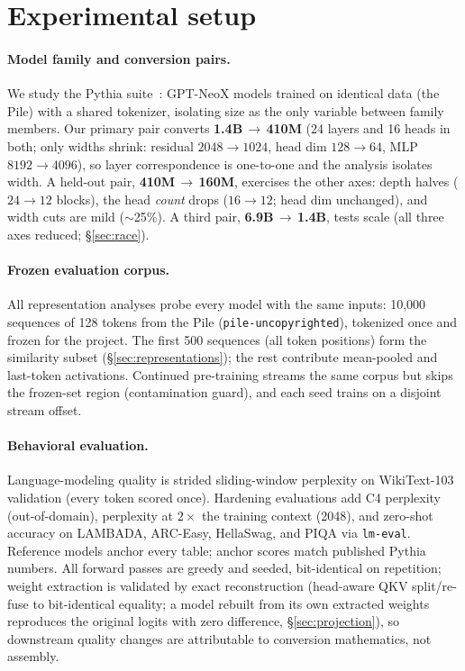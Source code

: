 \section{Experimental setup}
\label{sec:setup}

\paragraph{Model family and conversion pairs.}
We study the Pythia suite~\citep{biderman2023pythia}: GPT-NeoX models trained on
identical data (the Pile) with a shared tokenizer, isolating size as the
only variable between family members. Our primary pair converts
\textbf{1.4B}$\,\to\,$\textbf{410M} (24 layers and 16 heads in both; only widths
shrink: residual $2048\!\to\!1024$, head dim $128\!\to\!64$, MLP
$8192\!\to\!4096$), so layer correspondence is one-to-one and the analysis
isolates width. A held-out pair, \textbf{410M}$\,\to\,$\textbf{160M}, exercises
the other axes: depth halves ($24\!\to\!12$ blocks), the head \emph{count} drops
($16\!\to\!12$; head dim unchanged), and width cuts are mild ($\sim$25\%). A
third pair, \textbf{6.9B}$\,\to\,$\textbf{1.4B}, tests scale (all three axes
reduced; \S\ref{sec:race}).

\paragraph{Frozen evaluation corpus.}
All representation analyses probe every model with the same inputs: 10{,}000
sequences of 128 tokens from the Pile (\texttt{pile-uncopyrighted}), tokenized
once and frozen for the project. The first 500 sequences (all token positions)
form the similarity subset (\S\ref{sec:representations}); the rest contribute
mean-pooled and last-token activations. Continued pre-training streams the same
corpus but skips the frozen-set region (contamination guard), and each seed
trains on a disjoint stream offset.

\paragraph{Behavioral evaluation.}
Language-modeling quality is strided sliding-window perplexity on WikiText-103
validation (every token scored once). Hardening evaluations add C4 perplexity
(out-of-domain), perplexity at $2\times$ the training context (2048), and
zero-shot accuracy on LAMBADA, ARC-Easy, HellaSwag, and PIQA via
\texttt{lm-eval}. Reference models anchor every table; anchor scores match
published Pythia numbers. All forward passes are greedy and seeded, bit-identical
on repetition; weight extraction is validated by exact reconstruction (head-aware
QKV split/re-fuse to bit-identical equality; a model rebuilt from its own
extracted weights reproduces the original logits with zero difference,
\S\ref{sec:projection}), so downstream quality changes are attributable to
conversion mathematics, not assembly.

